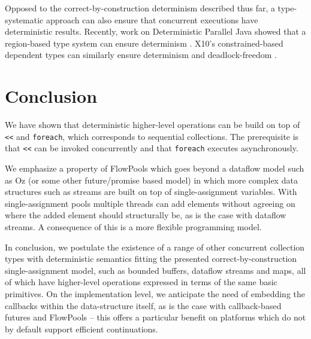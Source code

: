 \documentclass[runningheads,a4paper]{llncs}
\begin{document}
Opposed to the correct-by-construction determinism described thus far,
a type-systematic approach can also ensure that concurrent executions
have deterministic results.
Recently, work on Deterministic Parallel Java showed that a
region-based type system can ensure determinism \cite{Bocchino09}.
X10's constrained-based dependent types can similarly ensure
determinism and deadlock-freedom \cite{Saraswat07}.


\section{Conclusion}

We have shown that deterministic higher-level operations can be build
on top of \verb=<<= and \verb=foreach=, which corresponds to
sequential collections.
The prerequisite is that \verb=<<= can be invoked concurrently and
that \verb=foreach= executes asynchronously.

We emphasize a property of FlowPools which goes beyond
a dataflow model such as Oz (or some other future/promise based
model) in which more complex data structures such as streams are built
on top of single-assignment variables.
With single-assignment pools multiple threads can add elements without
agreeing on where the added element should structurally be, as is the
case with dataflow streams.
A consequence of this is a more flexible programming model.

In conclusion, we postulate the existence of a range of other
concurrent collection types with deterministic semantics fitting the
presented correct-by-construction single-assignment model, such as
bounded buffers, dataflow streams and maps, all of which have
higher-level operations expressed in terms of the same basic
primitives.
On the implementation level, we anticipate the need of embedding the
callbacks within the data-structure itself, as is the case with
callback-based futures and FlowPools -- this offers a particular
benefit on platforms which do not by default support efficient
continuations.






\appendix
\let\oldsec\section
\renewcommand{\section}[1]{\clearpage \oldsec{#1}}
\end{document}

